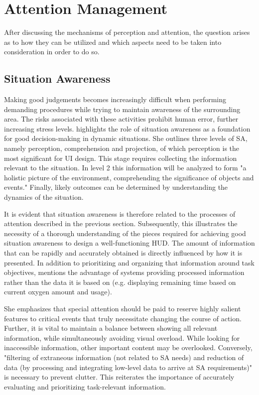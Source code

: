 \section{Attention Management}

After discussing the mechanisms of perception and attention, the question arises as to how they can be utilized and which aspects need to be taken into consideration in order to do so.

\subsection{Situation Awareness}


Making good judgements becomes increasingly difficult when performing demanding procedures while trying to maintain awareness of the surrounding area. The risks associated with these activities prohibit human error, further increasing stress levels.
\textcite{endsleyTheorySituationAwareness1995} highlights the role of situation awareness as a foundation for good decision-making in dynamic situations. She outlines three levels of SA, namely perception, comprehension and projection, of which perception is the most significant for UI design.
This stage requires collecting the information relevant to the situation. In level 2 this information will be analyzed to form "a holistic picture of the environment, comprehending the significance of objects and events." Finally, likely outcomes can be determined by understanding the dynamics of the situation.

It is evident that situation awareness is therefore related to the processes of attention described in the previous section. Subsequently, this illustrates the necessity of a thorough understanding of the pieces required for achieving good situation awareness to design a well-functioning HUD. The amount of information that can be rapidly and accurately obtained is directly influenced by how it is presented. In addition to prioritizing and organizing that information around task objectives, \textcite{endsleyTheorySituationAwareness1995} mentions the advantage of systems providing processed information rather than the data it is based on (e.g. displaying remaining time based on current oxygen amount and usage). 

She emphasizes that special attention should be paid to reserve highly salient features to critical events that truly necessitate changing the course of action. Further, it is vital to maintain a balance between showing all relevant information, while simultaneously avoiding visual overload. While looking for inaccessible information, other important content may be overlooked. Conversely, "filtering of extraneous information (not related to SA needs) and reduction of data (by processing and integrating low-level data to arrive at SA requirements)" is necessary to prevent clutter. This reiterates the importance of accurately evaluating and prioritizing task-relevant information.

